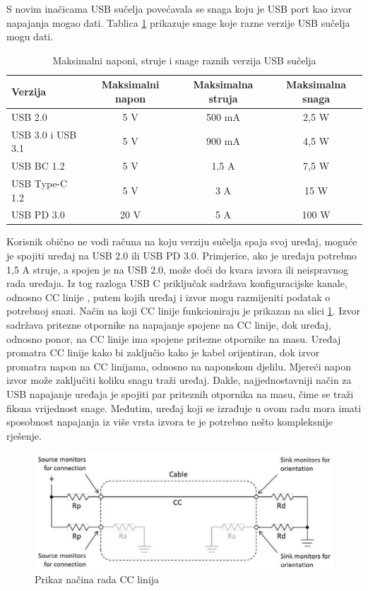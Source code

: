 S novim inačicama USB sučelja povećavala se snaga koju je USB port kao izvor napajanja mogao dati. Tablica \ref{tab:USB} prikazuje snage koje razne verzije USB sučelja mogu dati.
\begin{table}[htbp]
    \centering
    \caption{Maksimalni naponi, struje i snage raznih verzija USB sučelja \cite{ti:usb}}
    \begin{tabular}{|l|c|c|c|} \hline
    Verzija & Maksimalni napon & Maksimalna struja & Maksimalna snaga \\
    \hline
    USB 2.0 & 5 V & 500 mA & 2,5 W \\
    \hline
    USB 3.0 i USB 3.1 & 5 V & 900 mA & 4,5 W \\
    \hline
    USB BC 1.2 & 5 V & 1,5 A & 7,5 W \\
    \hline
    USB Type-C 1.2 & 5 V & 3 A & 15 W \\
    \hline
    USB PD 3.0 & 20 V & 5 A & 100 W \\
    \hline
    \end{tabular}
    \label{tab:USB}
\end{table}
Korisnik obično ne vodi računa na koju verziju sučelja spaja svoj uređaj, moguće je spojiti uređaj na USB 2.0 ili USB PD 3.0. Primjerice, ako je uređaju potrebno 1,5 A struje, a spojen je na USB 2.0, može doći do kvara izvora ili neispravnog rada uređaja. Iz tog razloga USB C priključak sadržava konfiguracijske kanale, odnosno CC linije , putem kojih uređaj i izvor mogu razmijeniti podatak o potrebnoj snazi. Način na koji CC linije funkcioniraju je prikazan na slici \ref{slk:USB_CC_LINES}. Izvor sadržava pritezne otpornike na napajanje spojene na CC linije, dok uređaj, odnosno ponor, na CC linije ima spojene pritezne otpornike na masu. Uređaj promatra CC linije kako bi zaključio kako je kabel orijentiran, dok izvor promatra napon na CC linijama, odnosno na naponskom djelilu. Mjereći napon izvor može zaključiti koliku snagu traži uređaj. Dakle, najjednostavniji način za USB napajanje uređaja je spojiti par priteznih otpornika na masu, čime se traži fiksna vrijednost snage. Međutim, uređaj koji se izrađuje u ovom radu mora imati sposobnost napajanja iz više vrsta izvora te je potrebno nešto kompleksnije rješenje.
\begin{figure}[htb]
    \centering
    \includegraphics[width=10 cm]{Figures/USB_CC_LINES.png}
    \caption{Prikaz načina rada CC linija \cite{ti:usb}}
    \label{slk:USB_CC_LINES}
\end{figure}

